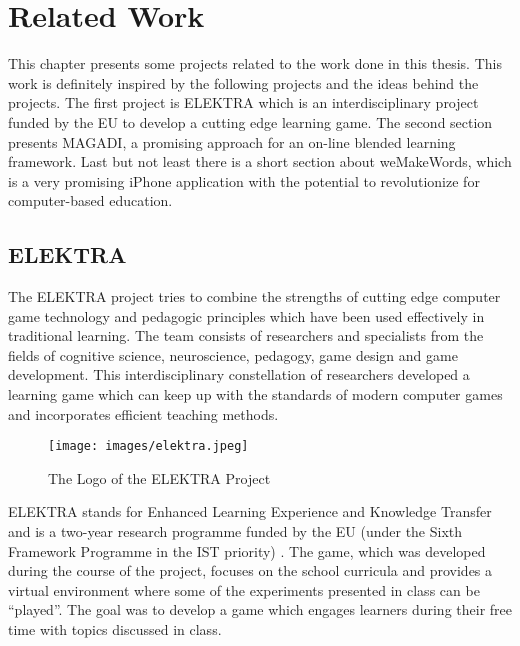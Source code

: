 \chapter{Related Work}

This chapter presents some projects related to the work done in this
thesis. This work is definitely inspired by the following projects and the ideas
behind the projects. The first project is ELEKTRA which is an interdisciplinary
project funded by the EU to develop a cutting edge learning game. The second
section presents MAGADI, a promising approach for an on-line blended learning
framework. Last but not least there is a short section about weMakeWords, which
is a very promising iPhone application with the potential to revolutionize for computer-based education.

\section{ELEKTRA}
The ELEKTRA project tries to combine the strengths
of cutting edge computer game technology and pedagogic principles which have
been used effectively in traditional learning. The team consists of
researchers and specialists from the fields of cognitive science,
neuroscience, pedagogy, game design and game development. This
interdisciplinary constellation of researchers developed a learning game which can
keep up with the standards of modern computer games and incorporates efficient
teaching methods.

\begin{figure}
    \centering
    \texttt{[image: images/elektra.jpeg]}
    \caption[The Logo of the ELEKTRA Project]
    {The Logo of the ELEKTRA Project}
    \label{elektra}
\end{figure}

ELEKTRA stands for Enhanced Learning Experience and Knowledge Transfer and is
a two-year research programme funded by the EU (under the Sixth Framework
Programme in the IST priority) \cite{Kickmeier-Rust2006}. The game, which was developed during the course
of the project, focuses on the school curricula and provides a virtual
environment where some of the experiments presented in class can be ``played''. The goal was to
develop a game which engages learners during their free time with topics
discussed in class.

